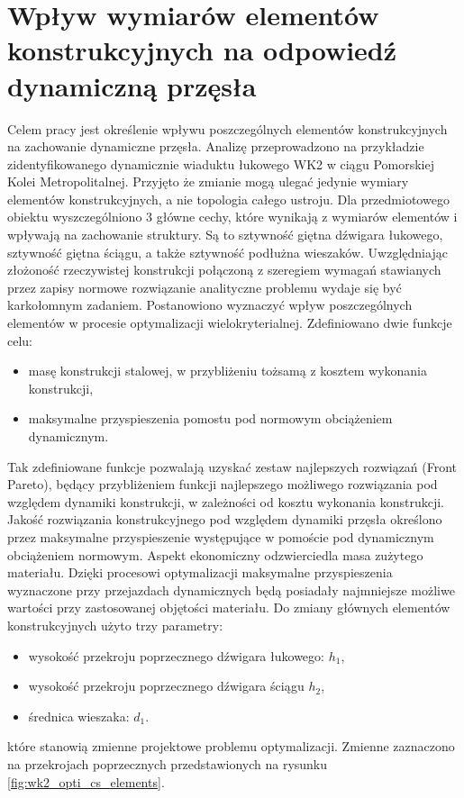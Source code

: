 \section{Wpływ wymiarów elementów konstrukcyjnych na odpowiedź dynamiczną przęsła}
Celem pracy jest określenie wpływu poszczególnych elementów konstrukcyjnych na zachowanie dynamiczne przęsła. Analizę przeprowadzono na przykładzie zidentyfikowanego dynamicznie wiaduktu łukowego WK2 w ciągu Pomorskiej Kolei Metropolitalnej. Przyjęto że zmianie mogą ulegać jedynie wymiary elementów konstrukcyjnych, a nie topologia całego ustroju. Dla przedmiotowego obiektu wyszczególniono 3 główne cechy, które wynikają z wymiarów elementów i wpływają na zachowanie struktury. Są to sztywność giętna dźwigara łukowego, sztywność giętna ściągu, a także sztywność podłużna wieszaków. Uwzględniając złożoność rzeczywistej konstrukcji połączoną z szeregiem wymagań stawianych przez zapisy normowe rozwiązanie analityczne problemu wydaje się być karkołomnym zadaniem. Postanowiono wyznaczyć wpływ poszczególnych elementów w procesie optymalizacji wielokryterialnej. Zdefiniowano dwie funkcje celu:
\begin{itemize}
	\item masę konstrukcji stalowej, w przybliżeniu tożsamą z kosztem wykonania konstrukcji,
	\item maksymalne przyspieszenia pomostu pod normowym obciążeniem dynamicznym.
\end{itemize}
Tak zdefiniowane funkcje pozwalają uzyskać zestaw najlepszych rozwiązań (Front Pareto), będący przybliżeniem funkcji najlepszego możliwego rozwiązania pod względem dynamiki konstrukcji, w zależności od kosztu wykonania konstrukcji. Jakość rozwiązania konstrukcyjnego pod względem dynamiki przęsła określono przez maksymalne przyspieszenie występujące w pomoście pod dynamicznym obciążeniem normowym. Aspekt ekonomiczny odzwierciedla masa zużytego materiału. Dzięki procesowi optymalizacji maksymalne przyspieszenia wyznaczone przy przejazdach dynamicznych będą posiadały najmniejsze możliwe wartości przy zastosowanej objętości materiału. Do zmiany głównych elementów konstrukcyjnych użyto trzy parametry:
\begin{itemize}
	\item wysokość przekroju poprzecznego dźwigara łukowego: $h_1$,
	\item wysokość przekroju poprzecznego dźwigara ściągu $h_2$,
	\item średnica wieszaka: $d_1$.
\end{itemize}
które stanowią zmienne projektowe problemu optymalizacji. Zmienne zaznaczono na przekrojach poprzecznych przedstawionych na rysunku \ref{fig:wk2_opti_cs_elements}.

